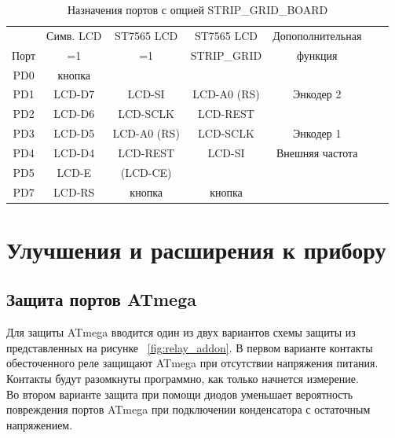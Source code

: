 \begin{table}[H]
  \begin{center}
    \begin{tabular}{| c || c | c | c | c | c | c |}
    \hline
           & Симв. LCD    & ST7565 LCD & ST7565 LCD    & Допополнительная \\
      Порт &   =1         &   =1       & STRIP\_GRID   & функция \\
    \hline
    \hline
    PD0    &  кнопка      &              &             & \\
    \hline
    PD1    &  LCD-D7      &  LCD-SI      & LCD-A0 (RS) & Энкодер 2  \\
    \hline
    PD2    &  LCD-D6      &  LCD-SCLK    & LCD-REST    & \\
    \hline
    PD3    &  LCD-D5      &  LCD-A0 (RS) & LCD-SCLK    & Энкодер 1 \\
    \hline
    PD4    &  LCD-D4      &  LCD-REST    & LCD-SI      & Внешняя частота \\
    \hline
    PD5    &  LCD-E       &  (LCD-CE)    &             & \\
    \hline
    PD7    &  LCD-RS      &  кнопка      & кнопка      & \\
    \hline
    \end{tabular}
  \end{center}
  \caption{Назначения портов с опцией STRIP\_GRID\_BOARD}
  \label{tab:grid-change}
\end{table}

\section{Улучшения и расширения к прибору}

\subsection{Защита портов ATmega}

Для защиты ATmega вводится один из двух вариантов схемы защиты из представленных на рисунке~ \ref{fig:relay_addon}.
В первом варианте контакты обесточенного реле защищают ATmega при отсутствии напряжения питания. Контакты будут разомкнуты программно, 
как только начнется измерение.\\

Во втором варианте защита при помощи диодов уменьшает вероятность повреждения портов ATmega при подключении 
конденсатора с остаточным напряжением.\\

